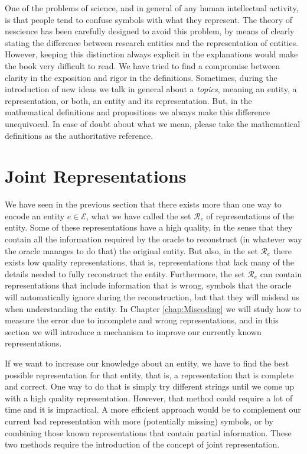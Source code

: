 \begin{remark}
One of the problems of science, and in general of any human intellectual activity, is that people tend to confuse symbols with what they represent. The theory of nescience has been carefully designed to avoid this problem, by means of clearly stating the difference between research entities and the representation of entities. However, keeping this distinction always explicit in the explanations would make the book very difficult to read. We have tried to find a compromise between clarity in the exposition and rigor in the definitions. Sometimes, during the introduction of new ideas we talk in general about a \emph{topics}, meaning an entity, a representation, or both, an entity and its representation. But, in the mathematical definitions and propositions we always make this difference unequivocal. In case of doubt about what we mean, please take the mathematical definitions as the authoritative reference. 
\end{remark}

%
%

\section{Joint Representations}
\label{sec:descriptions_joint_topic}

We have seen in the previous section that there exists more than one way to encode an entity $e \in \mathcal{E}$, what we have called the set $\mathcal{R}_e$ of representations of the entity. Some of these representations have a high quality, in the sense that they contain all the information required by the oracle to reconstruct (in whatever way the oracle manages to do that) the original entity. But also, in the set $\mathcal{R}_e$ there exists low quality representations, that is, representations that lack many of the details needed to fully reconstruct the entity. Furthermore, the set $\mathcal{R}_e$ can contain representations that include information that is wrong, symbols that the oracle will automatically ignore during the reconstruction, but that they will mislead us when understanding the entity. In Chapter \ref{chap:Miscoding} we will study how to measure the error due to incomplete and wrong representations, and in this section we will introduce a mechanism to improve our currently known representations.

If we want to increase our knowledge about an entity, we have to find the best possible representation for that entity, that is, a representation that is complete and correct. One way to do that is simply try different strings until we come up with a high quality representation. However, that method could require a lot of time and it is impractical. A more efficient approach would be to complement our current bad representation with more (potentially missing) symbols, or by combining those known representations that contain partial information. These two methods require the introduction of the concept of joint representation.

